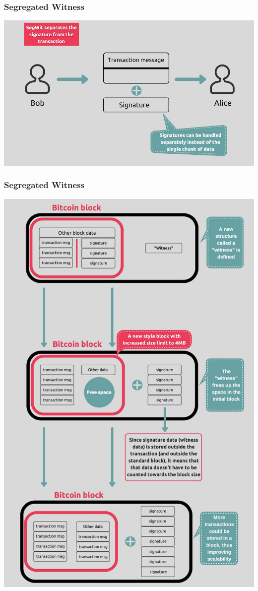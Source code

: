 \documentclass{beamer}
\begin{document}
\begin{frame}
  \frametitle{Segregated Witness}
 	\centering
	\includegraphics[scale=0.6]{segwit2}
\end{frame}
\begin{frame}
  \frametitle{Segregated Witness}
 	\centering
	\includegraphics[scale=0.3]{segwit3}
\end{frame}
\end{document}
